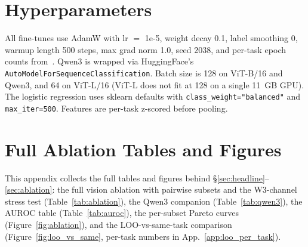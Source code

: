 \documentclass{article}
\begin{document}
\section{Hyperparameters}\label{app:hp}

All fine-tunes use AdamW with lr $=$ 1e-5, weight decay 0.1, label smoothing 0, warmup length 500 steps, max grad norm 1.0, seed 2038, and per-task epoch counts from~\cite{ilharco2023editing,ilharco2022patching}. Qwen3 is wrapped via HuggingFace's \texttt{AutoModelForSequenceClassification}. Batch size is 128 on ViT-B/16 and Qwen3, and 64 on ViT-L/16 (ViT-L does not fit at 128 on a single 11~GB GPU).
The logistic regression uses sklearn defaults with \texttt{class\_weight="balanced"} and \texttt{max\_iter=500}.
Features are per-task z-scored before pooling.

\section{Full Ablation Tables and Figures}\label{app:results_extra}

This appendix collects the full tables and figures behind \S\ref{sec:headline}--\ref{sec:ablation}: the full vision ablation with pairwise subsets and the W3-channel stress test (Table~\ref{tab:ablation}), the Qwen3 companion (Table~\ref{tab:qwen3}), the AUROC table (Table~\ref{tab:auroc}), the per-subset Pareto curves (Figure~\ref{fig:ablation}), and the LOO-vs-same-task comparison (Figure~\ref{fig:loo_vs_same}, per-task numbers in App.~\ref{app:loo_per_task}).


\end{document}

